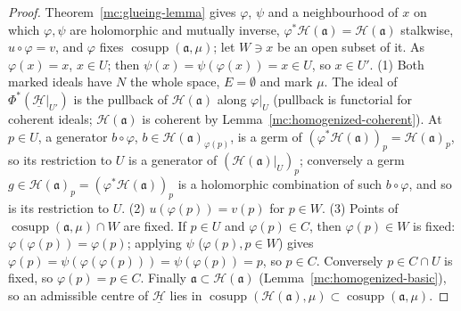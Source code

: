 \begin{proof}
\leanok
Theorem~\ref{mc:glueing-lemma} gives \(\varphi\), \(\psi\) and a neighbourhood of \(x\) on which \(\varphi,\psi\) are holomorphic and mutually inverse,
\(\varphi^*\mathcal H(\mathfrak a)=\mathcal H(\mathfrak a)\) stalkwise, \(u\circ\varphi=v\), and \(\varphi\) fixes \(\operatorname{cosupp}(\mathfrak a,\mu)\); let
\(W\ni x\) be an open subset of it. As \(\varphi(x)=x\), \(x\in U\); then \(\psi(x)=\psi(\varphi(x))=x\in U\), so \(x\in U'\).
(1) Both marked ideals have \(N\) the whole space, \(E=\emptyset\) and mark \(\mu\). The ideal of \(\Phi^*(\underline{\mathcal H}|_{U'})\) is the pullback of
\(\mathcal H(\mathfrak a)\) along \(\varphi|_U\) (pullback is functorial for coherent ideals; \(\mathcal H(\mathfrak a)\) is coherent by
Lemma~\ref{mc:homogenized-coherent}). At \(p\in U\), a generator \(b\circ\varphi\), \(b\in\mathcal H(\mathfrak a)_{\varphi(p)}\), is a germ of
\((\varphi^*\mathcal H(\mathfrak a))_p=\mathcal H(\mathfrak a)_p\), so its restriction to \(U\) is a generator of \((\mathcal H(\mathfrak a)|_U)_p\); conversely a germ
\(g\in\mathcal H(\mathfrak a)_p=(\varphi^*\mathcal H(\mathfrak a))_p\) is a holomorphic combination of such \(b\circ\varphi\), and so is its restriction to \(U\).
(2) \(u(\varphi(p))=v(p)\) for \(p\in W\).
(3) Points of \(\operatorname{cosupp}(\mathfrak a,\mu)\cap W\) are fixed. If \(p\in U\) and \(\varphi(p)\in C\), then \(\varphi(p)\in W\) is fixed:
\(\varphi(\varphi(p))=\varphi(p)\); applying \(\psi\) (\(\varphi(p),p\in W\)) gives \(\varphi(p)=\psi(\varphi(\varphi(p)))=\psi(\varphi(p))=p\), so \(p\in C\).
Conversely \(p\in C\cap U\) is fixed, so \(\varphi(p)=p\in C\). Finally \(\mathfrak a\subset\mathcal H(\mathfrak a)\) (Lemma~\ref{mc:homogenized-basic}), so an
admissible centre of \(\underline{\mathcal H}\) lies in \(\operatorname{cosupp}(\mathcal H(\mathfrak a),\mu)\subset\operatorname{cosupp}(\mathfrak a,\mu)\).
\end{proof}

